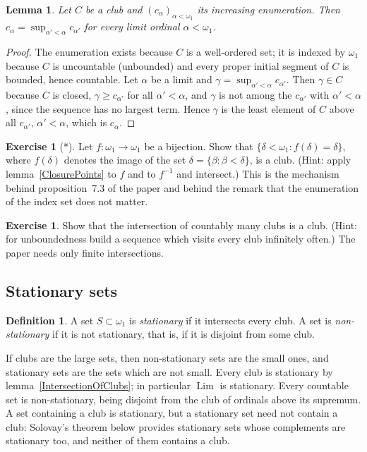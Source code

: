 \documentclass[12pt]{article}
\newtheorem{lemma}[theorem]{Lemma}
\theoremstyle{definition}
\newtheorem{definition}[theorem]{Definition}
\newtheorem{exercise}[theorem]{Exercise}
\theoremstyle{remark}
\newcommand{\Lim}{\operatorname{Lim}}
\begin{document}
\begin{lemma}\label{ContinuousEnumeration} Let $C$ be a club and
    ${(c_\alpha)}_{\alpha<\omega_1}$ its increasing enumeration. Then
    $c_\alpha=\sup_{\alpha'<\alpha}c_{\alpha'}$ for every limit ordinal
    $\alpha<\omega_1$.
\end{lemma}
\begin{proof} The enumeration exists because $C$ is a well-ordered set; it is
    indexed by $\omega_1$ because $C$ is uncountable (unbounded) and every
    proper initial segment of $C$ is bounded, hence countable. Let $\alpha$ be
    a limit and $\gamma=\sup_{\alpha'<\alpha}c_{\alpha'}$. Then $\gamma\in C$
    because $C$ is closed, $\gamma\geq c_{\alpha'}$ for all $\alpha'<\alpha$,
    and $\gamma$ is not among the $c_{\alpha'}$ with $\alpha'<\alpha$, since
    the sequence has no largest term. Hence $\gamma$ is the least element of
    $C$ above all $c_{\alpha'}$, $\alpha'<\alpha$, which is $c_\alpha$.
\end{proof}

\begin{exercise}[*] Let $f:\omega_1\to\omega_1$ be a bijection. Show that
    $\{\delta<\omega_1:f(\delta)=\delta\}$, where $f(\delta)$ denotes the image
    of the set $\delta=\{\beta:\beta<\delta\}$, is a club. (Hint: apply
    lemma~\ref{ClosurePoints} to $f$ and to $f^{-1}$ and intersect.) This is
    the mechanism behind proposition~7.3 of the paper and behind the remark
    that the enumeration of the index set does not matter.
\end{exercise}

\begin{exercise} Show that the intersection of countably many clubs is a
    club. (Hint: for unboundedness build a sequence which visits every club
    infinitely often.) The paper needs only finite intersections.
\end{exercise}

\subsection{Stationary sets}

\begin{definition} A set $S\subset\omega_1$ is \emph{stationary} if it
    intersects every club. A set is \emph{non-stationary} if it is not
    stationary, that is, if it is disjoint from some club.
\end{definition}

If clubs are the large sets, then non-stationary sets are the small ones,
and stationary sets are the sets which are not small. Every club is
stationary by lemma~\ref{IntersectionOfClubs}; in particular $\Lim$ is
stationary. Every countable set is non-stationary, being disjoint from the
club of ordinals above its supremum. A set containing a club is stationary,
but a stationary set need not contain a club: Solovay's theorem below
provides stationary sets whose complements are stationary too, and neither
of them contains a club.
\end{document}
